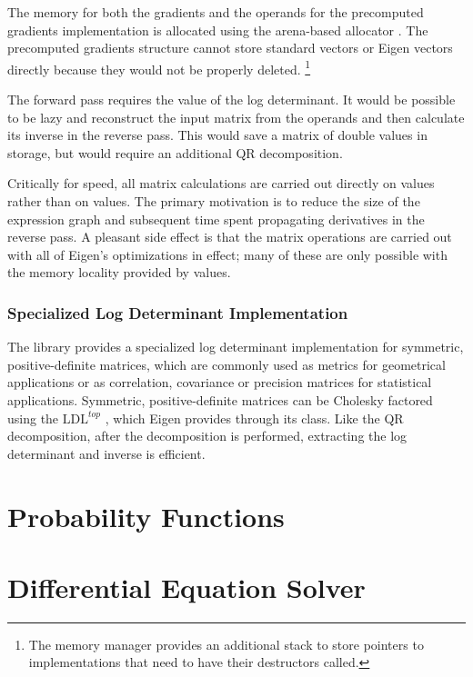 \documentclass[10pt]{article}
\begin{document}
The memory for both the gradients and the operands for the precomputed
gradients implementation is allocated using the arena-based allocator
.  The precomputed gradients structure cannot store
standard vectors or Eigen vectors directly because they would not be
properly deleted.%
%
\footnote{The  memory manager provides an additional
  stack to store pointers to  implementations that
  need to have their destructors called.}

The forward pass requires the value of the log determinant.  It would
be possible to be lazy and reconstruct the input matrix from the
operands and then calculate its inverse in the reverse pass.  This
would save a matrix of double values in storage, but would require an
additional QR decomposition.

Critically for speed, all matrix calculations are carried out directly
on  values rather than on  values.  The primary
motivation is to reduce the size of the expression graph and
subsequent time spent propagating derivatives in the reverse pass.  A
pleasant side effect is that the matrix operations are carried out
with all of Eigen's optimizations in effect; many of these are only
possible with the memory locality provided by  values.


\subsubsection{Specialized Log Determinant Implementation}

The  library provides a specialized log determinant
implementation for symmetric, positive-definite matrices, which are
commonly used as metrics for geometrical applications or as
correlation, covariance or precision matrices for statistical
applications.  Symmetric, positive-definite matrices can be Cholesky factored
using the $\mbox{LDL}^{top}$ 
\citep[Chapter~4]{GolubVanLoan:96}, which Eigen provides through its
 class.  Like the QR decomposition, after the decomposition
is performed, extracting the log determinant and inverse is efficient.


\section{Probability Functions}


\section{Differential Equation Solver}
\end{document}
